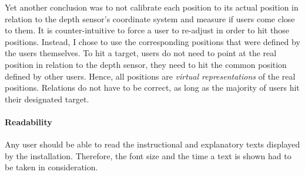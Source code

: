 Yet another conclusion was to not calibrate each position to its actual position in relation to the depth sensor's coordinate system  and measure if users come close to them. It is counter-intuitive to force a user to re-adjust in order to hit those positions. Instead, I chose to use the corresponding positions that were defined by the users themselves. To hit a target, users do not need to point at the real position in relation to the depth sensor, they need to hit the common position defined by other users. Hence, all positions are \textit{virtual representations} of the real positions. Relations do not have to be correct, as long as the majority of users hit their designated target. 


\paragraph{Readability} Any user should be able to read the instructional and explanatory texts displayed by the installation. Therefore, the font size and the time a text is shown had to be taken in consideration. 

